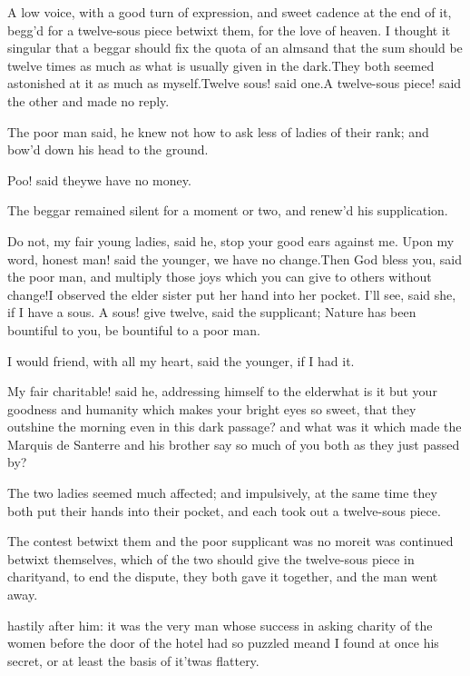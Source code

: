 \documentclass[twoside]{article}
\begin{document}
A low voice, with a good turn of
expression, and sweet cadence at the end
of it, begg’d for a twelve-sous piece
betwixt them, for the love of heaven.  I
thought it singular that a beggar should
fix the quota of an alms\tskk and that the
sum should be twelve times as much as what
is usually given in the dark.\tskk They
both seemed astonished at it as much as
myself.\tskk Twelve sous! said one.\tskk A
twelve-sous piece! said the other\tskk
and made no reply.

The poor man said, he knew not how to ask
less of ladies of their rank; and bow’d
down his head to the ground.

Poo! said they\tskk we have no money.

The beggar remained silent for a moment or
two, and renew’d his supplication.

\tskk Do not, my fair young ladies, said
he, stop your good ears against me.\tskk
Upon my word, honest man! said the
younger, we have no change.\tskk Then God
bless you, said the poor man, and multiply
those joys which you can give to others
without change!\tskk I observed the elder
sister put her hand into her pocket.\tskk
I’ll see, said she, if I have a sous.  A
sous! give twelve, said the supplicant;
Nature has been bountiful to you, be
bountiful to a poor man.

\tskk I would friend, with all my heart,
said the younger, if I had it.

My fair charitable! said he, addressing
himself to the elder\tskk what is it but
your goodness and humanity which makes
your bright eyes so sweet, that they
outshine the morning even in this dark
passage? and what was it which made the
Marquis de Santerre and his brother say so
much of you both as they just passed by?

The two ladies seemed much affected; and
impulsively, at the same time they both
put their hands into their pocket, and
each took out a twelve-sous piece.

The contest betwixt them and the poor
supplicant was no more\tskk it was
continued betwixt themselves, which of the
two should give the twelve-sous piece in
charity\tskk and, to end the dispute,
they both gave it together, and the man
went away.





\vskip 6pt


 hastily after him: it
was the very man whose success in asking
charity of the women before the door of
the hotel had so puzzled me\tskk and I
found at once his secret, or at least the
basis of it\tskk ’twas flattery.
\end{document}
